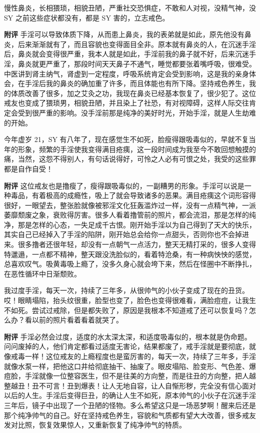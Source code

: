 \begin{case}[变丑]
    慢性鼻炎，长相猥琐，相貌丑陋，严重社交恐惧症，不敢和人对视，没精气神，没 SY 之前这些症状都没有，都是 SY 害的，立志戒色。

    \textbf{附评} 手淫可以导致体质下降，从而患上鼻炎，我的表弟就是如此，原先他没有鼻炎，后来渐渐就有了，而且容貌也变得面目全非。原本就有鼻炎的人，在沉迷手淫后，鼻炎就会变得很严重，我本人就是如此，手淫前我的鼻子就不好，后来沉迷手淫，鼻炎就更严重了，那段时间天天鼻子不通气，睡觉都要张着嘴呼吸，很难受。中医讲到肾主纳气，肾虚到一定程度，呼吸系统肯定会受到影响，这是我的亲身体会，在手淫后我的鼻炎的确加重了许多，而且体能也有所下降。坚持戒色养生，我的体质改善了很多，加之艾灸之功，我现在鼻炎已经基本恢复了，很少犯了。这位戒友也变成了猥琐男，相貌丑陋，并且染上了社恐，有对视障碍，这样人际交往肯定会受到很严重的影响。没手淫前那是纯净的美好时光，开始手淫，就是人生劫难的开始。
\end{case}

\begin{case}[变丑]
    今年虚岁 21，SY 有八年了，现在感觉生不如死，脸瘦得跟吸毒似的，早就不复当年的形象，频繁的手淫使我变得满目疮痍，这一段时间成为我至今不敢回想触摸的痛，当然，这怨不得别人，有句话说得好，可怜之人必有可恨之处，我受的这些罪都是自作自受！

    \textbf{附评} 这位戒友也是撸瘦了，瘦得跟吸毒似的，一副糟男的形象。手淫可以说是一种毒品，有着极高的成瘾性，吸上了就会导致诸多的恶果。满目疮痍这个词形容得很好，一眼望去，整张脸就像被邪淫文化狂轰滥炸过一样，没有一点精气神，一派萎靡颓废之象，衰败得厉害。很多人看着撸管前的照片，都会流泪，那是怎样的纯净，那是怎样的心态，一失足成千古恨。刚开始手淫以为自己得到了天大的快乐，其实自己已经掉入了手淫的陷阱，刚开始总会给你一点甜头，否则你也不会掉进来。很多撸者还很年轻，却没有一点朝气一点活力，整天无精打采的，很多人变得特邋遢，一点都不精神，整天跟没洗脸似的，看着特沧桑，有一种病怏怏的感觉，总喜欢叹气。吸黄毒吸上瘾了，没多久身心就会垮下来，然后在怪圈中不断挣扎，在恶性循环中日渐颓败。
\end{case}

\begin{case}[变丑]
    我过度手淫，每天一次，持续了三年多，从很帅气的小伙子变成了现在的丑货。哎！眼睛塌陷，抬头纹很重，脸型也变了，脸色也变得很难看，满脸痘痘，让我生不如死。尝试过戒除，但是都失败了，原因是我根本不知道戒了还可以恢复吗？怎么办？看以前的照片看着看着就哭了。

    \textbf{附评} 手淫必然会过度，适度的水太深太深，和适度吸毒似的，根本就是伪命题。问问废掉的人，他们肯定都看过适度无害论，结果都废了，戒手淫就是要彻底，就像戒毒一样！这位戒友的上瘾程度也是蛮厉害的，每天一次，持续了三年多，手淫就像水泵一样，把他这口井给彻底抽干、抽废了。眼皮塌陷、脸变形、气色差、爆痘脸，手淫就像一位整容医生，但不是往美的方向整，而是往丑的方向整，把人越整越丑！丑不可言！丑到爆表！让人无地自容，让人自惭形秽，完全没有信心面对以后的人生。手淫后变得巨丑，的确让人生不如死，原本帅气的小伙子在沉迷手淫三年后，镜子中出现了一个丑陋的怪物。多么希望这只是一场恶梦啊！醒来后还是那个纯净帅气的自己。好在坚持戒色养生，容貌和气质都有望大大改善，很多戒友发对比照，恢复效果惊人，又重新恢复了纯净帅气的特质。
\end{case}

